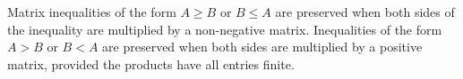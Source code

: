 Matrix inequalities of the form $A \geq B$ or $B \leq A$ are preserved when both sides of the inequality are multiplied by a non-negative matrix. Inequalities of the form $A > B$ or $B < A$ are preserved when both sides are multiplied by a positive matrix, provided the products have all entries finite.

